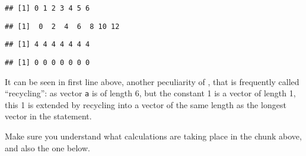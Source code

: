 \documentclass[paper=a4,headsepline,BCOR=12mm,twoside,open=right,%
titlepage,headings=small,fontsize=10pt,index=totoc,bibliography=totoc,%
captions=tableheading,captions=nooneline]{scrbook}\usepackage{knitr}
\begin{document}
\begin{knitrout}\footnotesize
{}\color{fgcolor}\begin{kframe}
\begin{alltt}
 \hlopt{+}  
\end{alltt}
\begin{verbatim}
## [1] 0 1 2 3 4 5 6
\end{verbatim}
\begin{alltt}
 \hlopt{+} \hlstd{)} \hlopt{*} 
\end{alltt}
\begin{verbatim}
## [1]  0  2  4  6  8 10 12
\end{verbatim}
\begin{alltt}
 \hlopt{+} 
\end{alltt}
\begin{verbatim}
## [1] 4 4 4 4 4 4 4
\end{verbatim}
\begin{alltt}
 \hlopt{-} 
\end{alltt}
\begin{verbatim}
## [1] 0 0 0 0 0 0 0
\end{verbatim}
\end{kframe}
\end{knitrout}

It can be seen in first line above, another peculiarity of \R, that is frequently called ``recycling'': as vector \texttt{a} is of length 6, but the constant 1 is a vector of length 1, this 1 is extended by recycling into a vector of the same length as the longest vector in the statement.

Make sure you understand what calculations are taking place in the chunk above, and also the one below.
\end{document}
